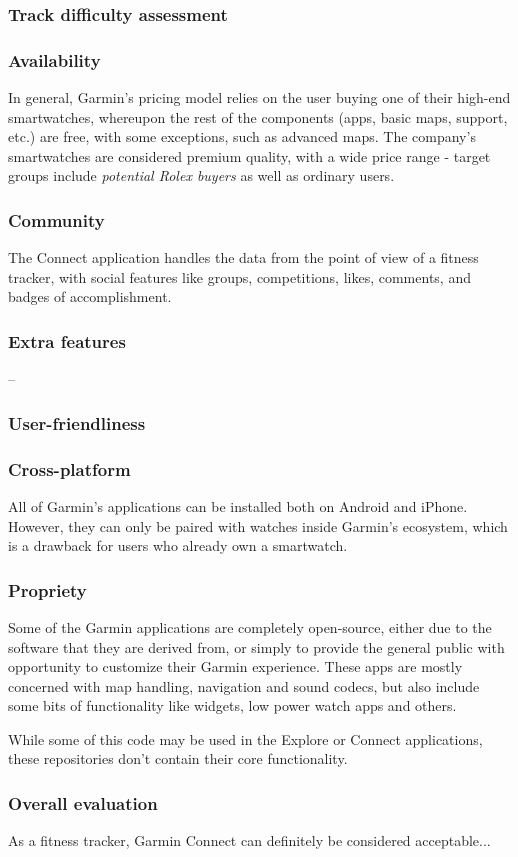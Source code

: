 \subsubsection*{Track difficulty assessment}

\subsubsection*{Availability}
In general, Garmin's pricing model relies on the user buying one of their high-end smartwatches, whereupon the rest of the components (apps, basic maps, support, etc.) are free, with some exceptions, such as advanced maps. 
The company's smartwatches are considered premium quality, with a wide price range - target groups include \textit{potential Rolex buyers}\cite{garmin-expensive} as well as ordinary users.\cite{garmin-watches-review}
\subsubsection*{Community}
The Connect application handles the data from the point of view of a fitness tracker, with social features like groups, competitions, likes, comments, and badges of accomplishment.\cite{garmin-connect}
\subsubsection*{Extra features} -- 
\subsubsection*{User-friendliness}

\subsubsection*{Cross-platform}
All of Garmin's applications can be installed both on Android and iPhone.
However, they can only be paired with watches inside Garmin's ecosystem, which is a drawback for users who already own a smartwatch.
\subsubsection*{Propriety}
Some of the Garmin applications are completely open-source, either due to the software that they are derived from, or simply to provide the general public with opportunity to customize their Garmin experience.\cite{garmin-open-source}\cite{garmin-connect-github-repos}
These apps are mostly concerned with map handling, navigation and sound codecs, but also include some bits of functionality like widgets, low power watch apps and others.

While some of this code may be used in the Explore or Connect applications, these repositories don't contain their core functionality.

\subsubsection*{Overall evaluation}
As a fitness tracker, Garmin Connect can definitely be considered acceptable...
